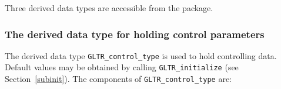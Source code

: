 \documentclass{galahad}
\newcommand{\packagename}{GL\-TR}
\begin{document}




\galtypes
Three derived data types are accessible from the package.


\subsubsection{The derived data type for holding control
 parameters}\label{typecontrol}
The derived data type
{\tt \packagename\_control\_type}
is used to hold controlling data. Default values may be obtained by calling
{\tt \packagename\_initialize}
(see Section~\ref{subinit}). The components of
{\tt \packagename\_control\_type}
are:
\end{document}
